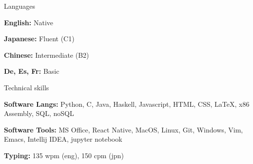 \documentclass[10pt]{resume} %
\begin{document}
\begin{multicols}{3}


\begin{rSection}{Languages}
	\item \textbf{English:} Native
	\item \textbf{Japanese:} Fluent (C1)
	\item \textbf{Chinese:} Intermediate (B2)
	\item \textbf{De, Es, Fr:} Basic
\end{rSection}


\begin{rSection}{Technical skills}
    \item \textbf{Software Langs:}
        Python,
        C,
        Java,
        Haskell,
        Javascript,
        HTML,
        CSS,
        \LaTeX,
        x86 Assembly,
        SQL,
        noSQL
    \item \textbf{Software Tools:}
        MS Office,
        React Native,
        MacOS,
        Linux,
        Git,
        Windows,
        Vim,
        Emacs,
        Intellij IDEA,
        jupyter notebook
    \item \textbf{Typing:} 135 wpm (eng), 150 cpm (jpn)
\end{rSection}

\end{multicols}

\end{document}
